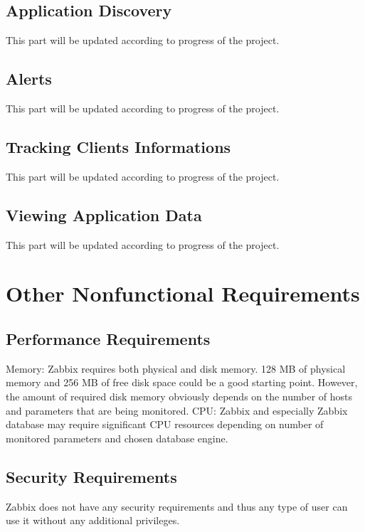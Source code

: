 \documentclass{article}
\begin{document}
	\subsection{Application Discovery}
This part will be updated according to progress of the project.
	\subsection{Alerts }
This part will be updated according to progress of the project.
	\subsection{Tracking Clients Informations }
This part will be updated according to progress of the project.
	\subsection{Viewing Application Data }
This part will be updated according to progress of the project.
\section{Other Nonfunctional Requirements} 
	\subsection{Performance Requirements }
Memory:\newline 
    Zabbix requires both physical and disk memory. 128 MB of physical memory and 256 MB of free disk space could be a good starting point. However, the amount of required disk memory obviously depends on the number of hosts and parameters that are being monitored.
\newline
CPU:\newline
    Zabbix and especially Zabbix database may require significant CPU resources depending on number of monitored parameters and chosen database engine.

	\subsection{Security Requirements  }
Zabbix does not have any security requirements and thus any type of user can use it without any additional privileges. \newline \newline
\end{document}
